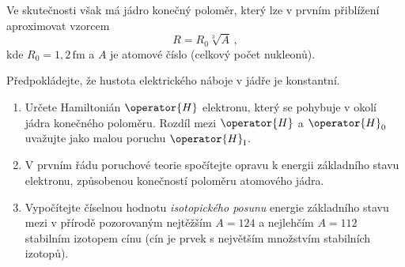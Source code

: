 \documentclass[a4paper,11pt,twoside]{book}
\begin{document}
    Ve skutečnosti však má jádro konečný poloměr, který lze v prvním přiblížení aproximovat vzorcem
    \begin{equation*}
        R=R_{0}\sqrt[3]{A}\,,
    \end{equation*}
    kde $R_{0}=1,\!2\,\mathrm{fm}$ a $A$ je atomové číslo (celkový počet nukleonů).
    
    Předpokládejte, že hustota elektrického náboje v jádře je konstantní.
    \begin{enumerate}
    \item
        Určete Hamiltonián $\operator{H}$ elektronu, který se pohybuje v okolí jádra konečného poloměru.
        Rozdíl mezi $\operator{H}$ a $\operator{H}_{0}$ uvažujte jako malou poruchu $\operator{H}_{\mathrm{I}}$.
        
    \item
        V prvním řádu poruchové teorie spočítejte opravu k energii základního stavu elektronu,
        způsobenou konečností poloměru atomového jádra.
        
    \item
        Vypočítejte číselnou hodnotu \emph{isotopického posunu} energie základního stavu mezi v přírodě pozorovaným nejtěžším $A=124$ a nejlehčím $A=112$ stabilním izotopem cínu (cín je prvek s největším množstvím stabilních izotopů).
    \end{enumerate}
\end{document}
